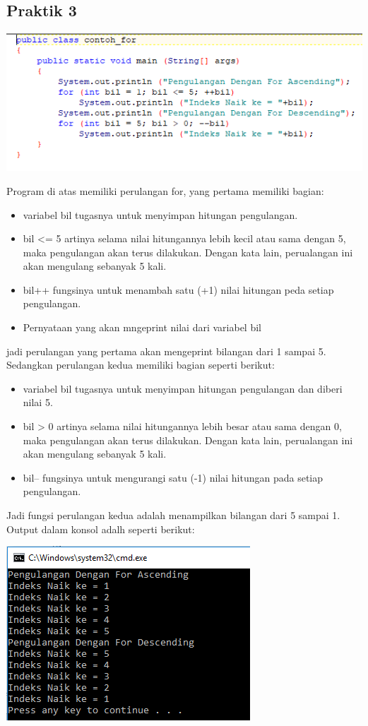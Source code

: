 \documentclass[a4paper,12pt]{article}
\begin{document}
\subsection{Praktik 3}
\begin{center}
	\includegraphics[scale=1]{Capture11}
\end{center}
Program di atas memiliki perulangan for, yang pertama memiliki bagian: 
\begin{itemize}
	\item variabel bil tugasnya untuk menyimpan hitungan pengulangan.
	\item bil <= 5 artinya selama nilai hitungannya lebih kecil atau sama dengan 5, maka pengulangan akan terus dilakukan. Dengan kata lain, perualangan ini akan mengulang sebanyak 5 kali.
	\item bil++ fungsinya untuk menambah satu (+1) nilai hitungan peda setiap pengulangan.
	\item Pernyataan yang akan mngeprint nilai dari variabel bil 
\end{itemize}
jadi perulangan yang pertama akan mengeprint bilangan dari 1 sampai 5.\\
Sedangkan perulangan kedua memiliki bagian seperti berikut:
\begin{itemize}
	\item     variabel bil tugasnya untuk menyimpan hitungan pengulangan dan diberi nilai 5.
	\item bil > 0 artinya selama nilai hitungannya lebih besar atau sama dengan 0, maka pengulangan akan terus dilakukan. Dengan kata lain, perualangan ini akan mengulang sebanyak 5 kali.
	\item bil-- fungsinya untuk mengurangi satu (-1) nilai hitungan pada setiap pengulangan.
\end{itemize}
Jadi fungsi perulangan kedua adalah menampilkan bilangan dari 5 sampai 1.\\
Output dalam konsol adalh seperti berikut:
\begin{center}
	\includegraphics[scale=1]{Capture12}
\end{center} 
\end{document}
